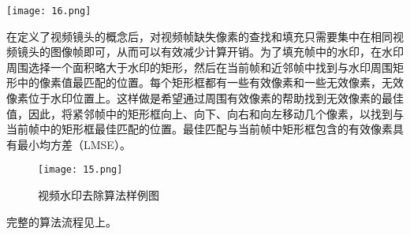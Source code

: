 \begin{figure*}[!htbp]
	\centering
	\texttt{[image: 16.png]}
	\label{fig:fig16}
\end{figure*}

	
在定义了视频镜头的概念后，对视频帧缺失像素的查找和填充只需要集中在相同视频镜头的图像帧即可，从而可以有效减少计算开销。为了填充帧中的水印，在水印周围选择一个面积略大于水印的矩形，然后在当前帧和近邻帧中找到与水印周围矩形中的像素值最匹配的位置。每个矩形框都有一些有效像素和一些无效像素，无效像素位于水印位置上。这样做是希望通过周围有效像素的帮助找到无效像素的最佳值，因此，将紧邻帧中的矩形框向上、向下、向右和向左移动几个像素，以找到与当前帧中的矩形框最佳匹配的位置。最佳匹配与当前帧中矩形框包含的有效像素具有最小均方差（LMSE）。

\begin{figure}[!htbp]
	\centering
	\texttt{[image: 15.png]}
	\caption{视频水印去除算法样例图}
	\label{fig:15}
\end{figure}

完整的算法流程见上。